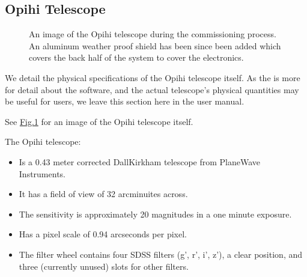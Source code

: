 \documentclass[letterpaper,11pt,english]{sphinxmanual}
\begin{document}
\sphinxstepscope


\subsection{Opihi Telescope}
\label{\detokenize{user/opihi_telescope:opihi-telescope}}\label{\detokenize{user/opihi_telescope:user-opihi-telescope}}\label{\detokenize{user/opihi_telescope::doc}}
\begin{figure}[htbp]
\centering
\capstart

\noindent{}
\caption{An image of the Opihi telescope during the commissioning process. An
aluminum weather proof shield has been since been added which covers the
back half of the system to cover the electronics.}\label{\detokenize{user/opihi_telescope:id1}}\label{\detokenize{user/opihi_telescope:figure-opihi-telescope-no-shield}}\end{figure}

\sphinxAtStartPar
We detail the physical specifications of the Opihi telescope itself. As the
{\hyperref[\detokenize{technical/index:technical-index}]{}} is more for detail about the software, and the
actual telescope’s physical quantities may be useful for users, we leave this
section here in the user manual.

\sphinxAtStartPar
See \hyperref[\detokenize{user/opihi_telescope:figure-opihi-telescope-no-shield}]{Fig.\@ \ref{\detokenize{user/opihi_telescope:figure-opihi-telescope-no-shield}}} for an image of the Opihi
telescope itself.

\sphinxAtStartPar
The Opihi telescope:
\begin{itemize}
\item {} 
\sphinxAtStartPar
Is a 0.43 meter corrected Dall\sphinxhyphen{}Kirkham telescope from PlaneWave Instruments.

\item {} 
\sphinxAtStartPar
It has a field of view of 32 arcminuites across.

\item {} 
\sphinxAtStartPar
The sensitivity is approximately 20 magnitudes in a one minute exposure.

\item {} 
\sphinxAtStartPar
Has a pixel scale of 0.94 arcseconds per pixel.

\item {} 
\sphinxAtStartPar
The filter wheel contains four SDSS filters (g’, r’, i’, z’), a clear position, and three (currently unused) slots for other filters.

\end{itemize}
\end{document}
